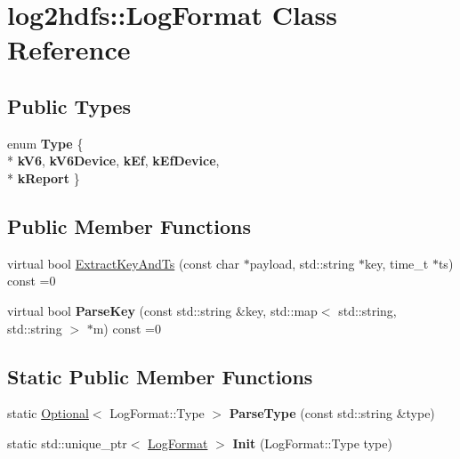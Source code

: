 \hypertarget{classlog2hdfs_1_1LogFormat}{}\section{log2hdfs\+:\+:Log\+Format Class Reference}
\label{classlog2hdfs_1_1LogFormat}
\subsection*{Public Types}
\begin{DoxyCompactItemize}
\item 
enum {\bfseries Type} \{ \\*
{\bfseries k\+V6}, 
{\bfseries k\+V6\+Device}, 
{\bfseries k\+Ef}, 
{\bfseries k\+Ef\+Device}, 
\\*
{\bfseries k\+Report}
 \}\hypertarget{classlog2hdfs_1_1LogFormat_a8d56f60d7e8d9ff7aaeeeebe1fd7e1dd}{}\label{classlog2hdfs_1_1LogFormat_a8d56f60d7e8d9ff7aaeeeebe1fd7e1dd}

\end{DoxyCompactItemize}
\subsection*{Public Member Functions}
\begin{DoxyCompactItemize}
\item 
virtual bool \hyperlink{classlog2hdfs_1_1LogFormat_a27855d25961e580cac510fcd6548e7ca}{Extract\+Key\+And\+Ts} (const char $\ast$payload, std\+::string $\ast$key, time\+\_\+t $\ast$ts) const =0
\item 
virtual bool {\bfseries Parse\+Key} (const std\+::string \&key, std\+::map$<$ std\+::string, std\+::string $>$ $\ast$m) const =0\hypertarget{classlog2hdfs_1_1LogFormat_ac509ca169976fb2a63203e6bb29fb8f7}{}\label{classlog2hdfs_1_1LogFormat_ac509ca169976fb2a63203e6bb29fb8f7}

\end{DoxyCompactItemize}
\subsection*{Static Public Member Functions}
\begin{DoxyCompactItemize}
\item 
static \hyperlink{classlog2hdfs_1_1Optional}{Optional}$<$ Log\+Format\+::\+Type $>$ {\bfseries Parse\+Type} (const std\+::string \&type)\hypertarget{classlog2hdfs_1_1LogFormat_a8cc200b8141732e212f675ec4eb65a7d}{}\label{classlog2hdfs_1_1LogFormat_a8cc200b8141732e212f675ec4eb65a7d}

\item 
static std\+::unique\+\_\+ptr$<$ \hyperlink{classlog2hdfs_1_1LogFormat}{Log\+Format} $>$ {\bfseries Init} (Log\+Format\+::\+Type type)\hypertarget{classlog2hdfs_1_1LogFormat_a479ee42ae9c8e32188f2691b1ee6248e}{}\label{classlog2hdfs_1_1LogFormat_a479ee42ae9c8e32188f2691b1ee6248e}

\end{DoxyCompactItemize}


